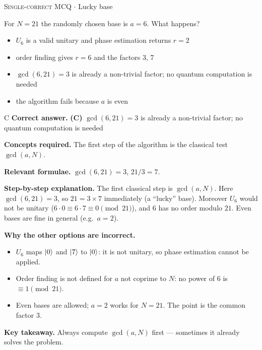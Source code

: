 \documentclass[11pt,a4paper]{article}
\newcommand{\optlabel}[1]{\textbf{(#1)}}
\newcommand{\correctlabel}[1]{\textcolor{okgreen}{\textbf{(#1)}\,\ding{51}}}
\newenvironment{qitem}[1]{\begin{list}{}{\setlength{\leftmargin}{3.3em}\setlength{\labelwidth}{3.1em}%
  \setlength{\labelsep}{0.2em}\setlength{\topsep}{3pt}\setlength{\parsep}{3pt}}\item[\textbf{Q.#1}\hfill]}{\end{list}}
\newcommand{\qsep}{\par\vspace{2pt}{\color{black!15}\hrule}\vspace{4pt}}
\newcommand{\qmeta}[2]{{\footnotesize\color{black!60}\textsc{#1} \;$\cdot$\; #2}\par}
\begin{document}
\begin{qitem}{45}
\qmeta{Single-correct MCQ}{Lucky base}
For $N = 21$ the randomly chosen base is $a = 6$. What happens?
\begin{itemize}[leftmargin=2.6em, labelsep=0.4em, itemsep=2pt, topsep=3pt]
\item[\optlabel{A}] $U_6$ is a valid unitary and phase estimation returns $r = 2$
\item[\optlabel{B}] order finding gives $r = 6$ and the factors $3$, $7$
\item[\correctlabel{C}] $\gcd(6, 21) = 3$ is already a non-trivial factor; no quantum computation is needed
\item[\optlabel{D}] the algorithm fails because $a$ is even
\end{itemize}
\end{qitem}
\begin{solbox}{C}
\textbf{\color{brand}Correct answer.} \textcolor{okgreen}{\textbf{(C)}} $\gcd(6, 21) = 3$ is already a non-trivial factor; no quantum computation is needed

\textbf{\color{brand}Concepts required.} The first step of the algorithm is the classical test $\gcd(a, N)$.

\textbf{\color{brand}Relevant formulae.} $\gcd(6, 21) = 3$, $21/3 = 7$.

\textbf{\color{brand}Step-by-step explanation.} The first classical step is $\gcd(a, N)$. Here $\gcd(6, 21) = 3$, so $21 = 3\times7$ immediately (a ``lucky'' base). Moreover $U_6$ would not be unitary
($6\cdot0 \equiv 6\cdot7 \equiv 0 \pmod{21}$), and $6$ has no order modulo $21$. Even bases are fine in general (e.g.\ $a = 2$).

\textbf{\color{brand}Why the other options are incorrect.}
\begin{itemize}[leftmargin=2.4em, itemsep=1pt, topsep=2pt]
\item[\textbf{(A)}] $U_6$ maps $\ket0$ and $\ket7$ to $\ket0$: it is not unitary, so phase estimation cannot be applied.
\item[\textbf{(B)}] Order finding is not defined for $a$ not coprime to $N$: no power of $6$ is $\equiv 1 \pmod{21}$.
\item[\textbf{(D)}] Even bases are allowed; $a = 2$ works for $N = 21$. The point is the common factor $3$.
\end{itemize}
\textbf{\color{brand}Key takeaway.} Always compute $\gcd(a, N)$ first --- sometimes it already solves the problem.
\end{solbox}
\qsep
\end{document}
